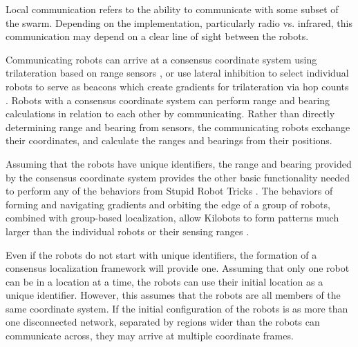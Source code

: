 \documentclass[]{article}
\begin{document}
Local communication refers to the ability to communicate with some subset of the swarm.
Depending on the implementation, particularly radio vs. infrared, this communication may depend on a clear line of sight between the robots. 

Communicating robots can arrive at a consensus coordinate system using trilateration  based on range sensors \cite{cheng2005robust}, or use lateral inhibition to select individual robots to serve as beacons which create gradients for trilateration via hop counts \cite{nagpal1999organizing}.
Robots with a consensus coordinate system can perform range and bearing calculations in relation to each other by communicating.
Rather than directly determining range and bearing from sensors, the communicating robots exchange their coordinates, and calculate the ranges and bearings from their positions. 

Assuming that the robots have unique identifiers, the range and bearing provided by the consensus coordinate system provides the other basic functionality needed to perform any of the behaviors from Stupid Robot Tricks \cite{mclurkin2004stupid}.
The behaviors of forming and navigating gradients and orbiting the edge of a group of robots, combined with group-based localization, allow Kilobots to form patterns much larger than the individual robots or their sensing ranges \cite{Rubenstein795}.

Even if the robots do not start with unique identifiers, the formation of a consensus localization framework will provide one.
Assuming that only one robot can be in a location at a time, the robots can use their initial location as a unique identifier. 
However, this assumes that the robots are all members of the same coordinate system.
If the initial configuration of the robots is as more than one disconnected network, separated by regions wider than the robots can communicate across, they may arrive at multiple coordinate frames.

\end{document}
